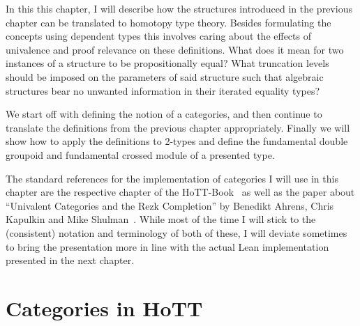 In this this chapter, I will describe how the structures introduced in the previous
chapter can be translated to homotopy type theory.
Besides formulating the concepts using dependent types this involves caring about
the effects of univalence and proof relevance on these definitions.
What does it mean for two instances of a structure to be propositionally equal?
What truncation levels should be imposed on the parameters of said structure
such that algebraic structures bear no unwanted information in their iterated
equality types?

We start off with defining the notion of a categories, and then continue to
translate the definitions from the previous chapter appropriately.
Finally we will show how to apply the definitions to 2-types and define the
fundamental double groupoid and fundamental crossed module of a presented type.

The standard references for the implementation of categories I will use in this
chapter are the respective chapter of the HoTT-Book~\cite{hottbook} as well as
the paper about ``Univalent Categories and the Rezk Completion'' by Benedikt
Ahrens, Chris Kapulkin and Mike Shulman~\cite{rezk-completion}.
While most of the time I will stick to the (consistent) notation and terminology
of both of these, I will deviate sometimes to bring the presentation more
in line with the actual Lean implementation presented in the next chapter.

\section{Categories in HoTT}

